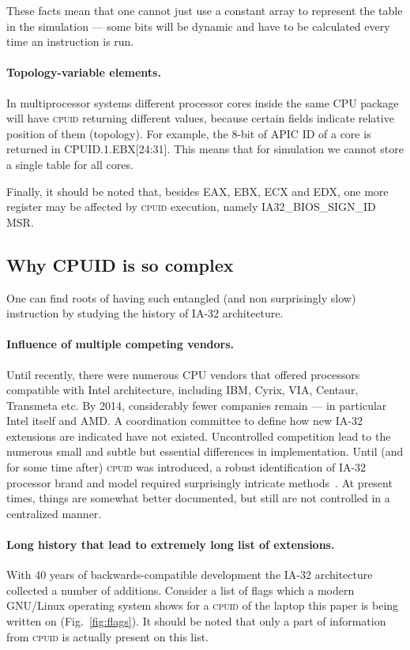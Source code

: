 \documentclass[a4paper,10pt,oneside,unicode]{article}
\newcommand{\cpuid}{\textsc{cpuid} }
\begin{document}
These facts mean that one cannot just use a constant array to represent the table in the simulation --- some bits will be dynamic and have to be calculated every time an instruction is run.

\paragraph{Topology-variable elements.} In multiprocessor systems different processor cores inside the same CPU package will have \cpuid returning different values, because certain fields indicate relative position of them (topology). For example, the 8-bit of APIC ID of a core is returned in CPUID.1.EBX[24:31]. This means that for simulation we cannot store a single table for all cores.

Finally, it should be noted that, besides EAX, EBX, ECX and EDX, one more register may be affected by \cpuid execution, namely IA32\_BIOS\_SIGN\_ID MSR.

\subsection{Why CPUID is so complex}

One can find roots of having such entangled (and non surprisingly slow) instruction by studying the history of IA-32 architecture.
\paragraph{Influence of multiple competing vendors.} Until recently, there were numerous {CPU} vendors that offered processors compatible with Intel architecture, including IBM, Cyrix, VIA, Centaur, Transmeta etc. By 2014, considerably fewer companies remain --- in particular Intel itself and AMD. A coordination committee to define how new IA-32 extensions are indicated have not existed. Uncontrolled competition lead to the numerous small and subtle but essential differences in implementation. 
Until (and for some time after) \cpuid was introduced, a robust identification of IA-32 processor brand and model required surprisingly intricate methods~\cite{cpuid-wars}. At present times, things are somewhat better documented, but still are not controlled in a centralized manner.

\paragraph{Long history that lead to extremely long list of extensions.} With 40 years of backwards-compatible development the IA-32 architecture collected a number of additions. Consider a list of flags which a modern GNU/Linux operating system shows for a \cpuid of the laptop this paper is being written on (Fig.~\ref{fig:flags}). It should be noted that only a part of information from \cpuid is actually present on this list.
\end{document}
